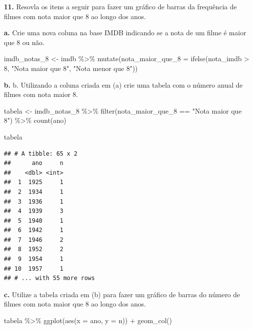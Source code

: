 \documentclass[
]{book}
\newenvironment{Shaded}{\begin{snugshade}}{\end{snugshade}}
\newcommand{\AttributeTok}[1]{\textcolor[rgb]{0.77,0.63,0.00}{#1}}
\newcommand{\DecValTok}[1]{\textcolor[rgb]{0.00,0.00,0.81}{#1}}
\newcommand{\FunctionTok}[1]{\textcolor[rgb]{0.00,0.00,0.00}{#1}}
\newcommand{\NormalTok}[1]{#1}
\newcommand{\OtherTok}[1]{\textcolor[rgb]{0.56,0.35,0.01}{#1}}
\newcommand{\SpecialCharTok}[1]{\textcolor[rgb]{0.00,0.00,0.00}{#1}}
\newcommand{\StringTok}[1]{\textcolor[rgb]{0.31,0.60,0.02}{#1}}
\begin{document}
\textbf{11.} Resovla os itens a seguir para fazer um gráfico de barras da frequência de filmes com nota maior que 8 ao longo dos anos.

\textbf{a.} Crie uma nova coluna na base IMDB indicando se a nota de um filme é maior que 8 ou não.

\begin{Shaded}
\begin{Highlighting}[]
\NormalTok{imdb\_notas\_8 }\OtherTok{\textless{}{-}}\NormalTok{ imdb }\SpecialCharTok{\%\textgreater{}\%}
  \FunctionTok{mutate}\NormalTok{(}\AttributeTok{nota\_maior\_que\_8 =} \FunctionTok{ifelse}\NormalTok{(nota\_imdb }\SpecialCharTok{\textgreater{}} \DecValTok{8}\NormalTok{, }\StringTok{"Nota maior que 8"}\NormalTok{, }\StringTok{"Nota menor que 8"}\NormalTok{))}
\end{Highlighting}
\end{Shaded}

\textbf{b.} b. Utilizando a coluna criada em (a) crie uma tabela com o número anual de filmes com nota maior 8.

\begin{Shaded}
\begin{Highlighting}[]
\NormalTok{tabela }\OtherTok{\textless{}{-}}\NormalTok{ imdb\_notas\_8 }\SpecialCharTok{\%\textgreater{}\%}
  \FunctionTok{filter}\NormalTok{(nota\_maior\_que\_8 }\SpecialCharTok{==} \StringTok{"Nota maior que 8"}\NormalTok{) }\SpecialCharTok{\%\textgreater{}\%}
  \FunctionTok{count}\NormalTok{(ano)}

\NormalTok{tabela}
\end{Highlighting}
\end{Shaded}

\begin{verbatim}
## # A tibble: 65 x 2
##      ano     n
##    <dbl> <int>
##  1  1925     1
##  2  1934     1
##  3  1936     1
##  4  1939     3
##  5  1940     1
##  6  1942     1
##  7  1946     2
##  8  1952     2
##  9  1954     1
## 10  1957     1
## # ... with 55 more rows
\end{verbatim}

\textbf{c.} Utilize a tabela criada em (b) para fazer um gráfico de barras do número de filmes com nota maior que 8 ao longo dos anos.

\begin{Shaded}
\begin{Highlighting}[]
\NormalTok{tabela }\SpecialCharTok{\%\textgreater{}\%}
  \FunctionTok{ggplot}\NormalTok{(}\FunctionTok{aes}\NormalTok{(}\AttributeTok{x =}\NormalTok{ ano, }\AttributeTok{y =}\NormalTok{ n)) }\SpecialCharTok{+}
  \FunctionTok{geom\_col}\NormalTok{()}
\end{Highlighting}
\end{Shaded}
\end{document}
